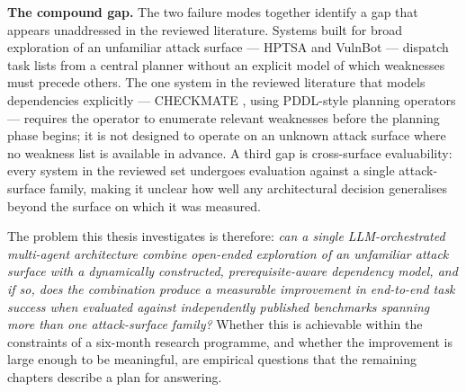 \textbf{The compound gap.} The two failure modes together identify a gap that appears unaddressed in the reviewed literature. Systems built for broad exploration of an unfamiliar attack surface --- HPTSA \citep{zhu2024hptsa} and VulnBot \citep{kong2025vulnbot} --- dispatch task lists from a central planner without an explicit model of which weaknesses must precede others. The one system in the reviewed literature that models dependencies explicitly --- CHECKMATE \citep{wang2025checkmate}, using PDDL-style planning operators --- requires the operator to enumerate relevant weaknesses before the planning phase begins; it is not designed to operate on an unknown attack surface where no weakness list is available in advance. A third gap is cross-surface evaluability: every system in the reviewed set undergoes evaluation against a single attack-surface family, making it unclear how well any architectural decision generalises beyond the surface on which it was measured.

The problem this thesis investigates is therefore: \textit{can a single LLM-orchestrated multi-agent architecture combine open-ended exploration of an unfamiliar attack surface with a dynamically constructed, prerequisite-aware dependency model, and if so, does the combination produce a measurable improvement in end-to-end task success when evaluated against independently published benchmarks spanning more than one attack-surface family?} Whether this is achievable within the constraints of a six-month research programme, and whether the improvement is large enough to be meaningful, are empirical questions that the remaining chapters describe a plan for answering.
